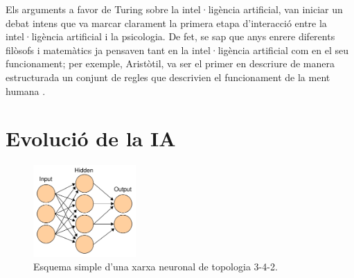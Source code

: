Els arguments a favor de Turing sobre la intel·ligència artificial, van iniciar un debat intens que va marcar clarament la primera etapa d'interacció entre la intel·ligència artificial i la psicologia. De fet, se sap que anys enrere diferents filòsofs i matemàtics ja pensaven tant en la intel·ligència artificial com en el seu funcionament; per exemple, Aristòtil, va ser el primer en descriure de manera estructurada un conjunt de regles que descrivien el funcionament de la ment humana \cite{IAgen} \cite{IAgenII}.

\section{Evolució de la IA}

\begin{figure}[ht!]
\centering
\includegraphics[height=35mm]{data/nn.png}
\caption{Esquema simple d'una xarxa neuronal de topologia 3-4-2.}
\label{nn}
\end{figure} 


